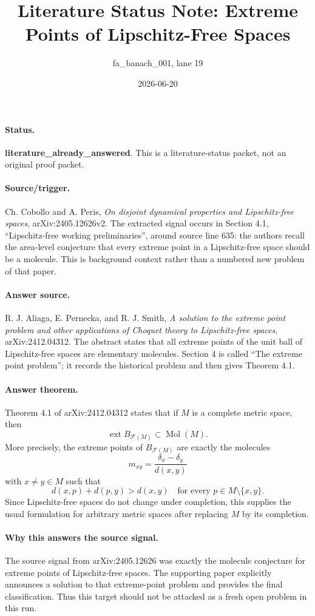 \documentclass[11pt]{article}
\title{Literature Status Note: Extreme Points of Lipschitz-Free Spaces}
\author{fa\_banach\_001, lane 19}
\date{2026-06-20}
\newcommand{\F}{\mathcal F}
\newcommand{\ext}{\operatorname{ext}}
\newcommand{\Mol}{\operatorname{Mol}}
\begin{document}
\maketitle

\paragraph{Status.}
\textbf{literature\_already\_answered}.  This is a literature-status packet, not
an original proof packet.

\paragraph{Source/trigger.}
Ch. Cobollo and A. Peris, \emph{On disjoint dynamical properties and
Lipschitz-free spaces}, arXiv:2405.12626v2.  The extracted signal occurs in
Section 4.1, ``Lipschitz-free working preliminaries'', around source line 635:
the authors recall the area-level conjecture that every extreme point in a
Lipschitz-free space should be a molecule.  This is background context rather
than a numbered new problem of that paper.

\paragraph{Answer source.}
R. J. Aliaga, E. Pernecka, and R. J. Smith, \emph{A solution to the extreme
point problem and other applications of Choquet theory to Lipschitz-free
spaces}, arXiv:2412.04312.  The abstract states that all extreme points of the
unit ball of Lipschitz-free spaces are elementary molecules.  Section 4 is
called ``The extreme point problem''; it records the historical problem and
then gives Theorem 4.1.

\paragraph{Answer theorem.}
Theorem 4.1 of arXiv:2412.04312 states that if \(M\) is a complete metric
space, then
\[
   \ext B_{\F(M)} \subset \Mol(M).
\]
More precisely, the extreme points of \(B_{\F(M)}\) are exactly the molecules
\[
   m_{xy}=\frac{\delta_x-\delta_y}{d(x,y)}
\]
with \(x\neq y\in M\) such that
\[
   d(x,p)+d(p,y)>d(x,y)
   \quad\text{for every }p\in M\setminus\{x,y\}.
\]
Since Lipschitz-free spaces do not change under completion, this supplies the
usual formulation for arbitrary metric spaces after replacing \(M\) by its
completion.

\paragraph{Why this answers the source signal.}
The source signal from arXiv:2405.12626 was exactly the molecule conjecture for
extreme points of Lipschitz-free spaces.  The supporting paper explicitly
announces a solution to that extreme-point problem and provides the final
classification.  Thus this target should not be attacked as a fresh open
problem in this run.
\end{document}
